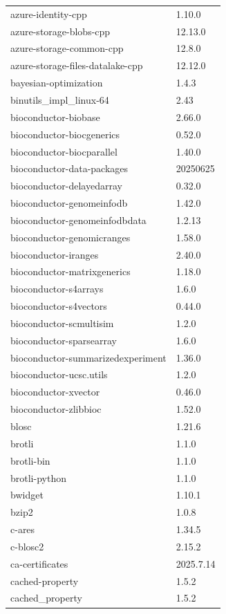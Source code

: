 \begin{longtable}{ll}
    azure-identity-cpp&1.10.0 \\
    azure-storage-blobs-cpp&12.13.0 \\
    azure-storage-common-cpp&12.8.0 \\
    azure-storage-files-datalake-cpp&12.12.0 \\
    bayesian-optimization&1.4.3 \\
    binutils\_impl\_linux-64&2.43 \\
    bioconductor-biobase&2.66.0 \\
    bioconductor-biocgenerics&0.52.0 \\
    bioconductor-biocparallel&1.40.0 \\
    bioconductor-data-packages&20250625 \\
    bioconductor-delayedarray&0.32.0 \\
    bioconductor-genomeinfodb&1.42.0 \\
    bioconductor-genomeinfodbdata&1.2.13 \\
    bioconductor-genomicranges&1.58.0 \\
    bioconductor-iranges&2.40.0 \\
    bioconductor-matrixgenerics&1.18.0 \\
    bioconductor-s4arrays&1.6.0 \\
    bioconductor-s4vectors&0.44.0 \\
    bioconductor-scmultisim&1.2.0 \\
    bioconductor-sparsearray&1.6.0 \\
    bioconductor-summarizedexperiment&1.36.0 \\
    bioconductor-ucsc.utils&1.2.0 \\
    bioconductor-xvector&0.46.0 \\
    bioconductor-zlibbioc&1.52.0 \\
    blosc&1.21.6 \\
    brotli&1.1.0 \\
    brotli-bin&1.1.0 \\
    brotli-python&1.1.0 \\
    bwidget&1.10.1 \\
    bzip2&1.0.8 \\
    c-ares&1.34.5 \\
    c-blosc2&2.15.2 \\
    ca-certificates&2025.7.14 \\
    cached-property&1.5.2 \\
    cached\_property&1.5.2 \\

\end{longtable}
